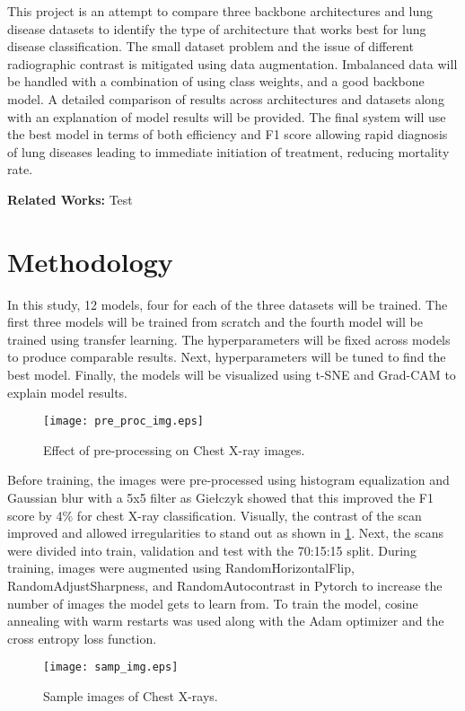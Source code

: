 \documentclass[10pt,twocolumn,letterpaper]{article}
\begin{document}
This project is an attempt to compare three backbone architectures and lung disease datasets to identify the type of architecture that works best for lung disease classification. The small dataset problem and the issue of different radiographic contrast \cite{andrew2022rad} is mitigated using data augmentation. Imbalanced data will be handled with a combination of using class weights, and a good backbone model. A detailed comparison of results across architectures and datasets along with an explanation of model results will be provided. The final system will use the best model in terms of both efficiency and F1 score allowing rapid diagnosis of lung diseases leading to immediate initiation of treatment, reducing mortality rate.

\textbf{Related Works:} Test 
\section{Methodology}
\label{sec:prop_method}
In this study, 12 models, four for each of the three datasets will be trained. The first three models will be trained from scratch and the fourth model will be trained using transfer learning. The hyperparameters will be fixed across models to produce comparable results. Next, hyperparameters will be tuned to find the best model. Finally, the models will be visualized using t-SNE and Grad-CAM \cite{jacobgilpytorchcam} to explain model results. 
\begin{figure}[t]
  \centering
  \texttt{[image: pre\_proc\_img.eps]}  
   \caption{Effect of pre-processing on Chest X-ray images.}
   \vspace{-1em}
   \label{fig:pre_proc_img}
\end{figure}
Before training, the images were pre-processed using histogram equalization and Gaussian blur with a 5x5 filter as Giełczyk \etal \cite{gielczyk2022pre} showed that this improved the F1 score by 4\% for chest X-ray classification. Visually, the contrast of the scan improved and allowed irregularities to stand out as shown in \cref{fig:pre_proc_img}. Next, the scans were divided into train, validation and test with the 70:15:15 split. During training, images were augmented using RandomHorizontalFlip, RandomAdjustSharpness, and RandomAutocontrast in Pytorch \cite{transforms} to increase the number of images the model gets to learn from. To train the model, cosine annealing with warm restarts \cite{loshchilov2016sgdr} was used along with the Adam optimizer \cite{kingma2014adam} and the cross entropy loss function. 
\begin{figure}[t]
  \centering
  \texttt{[image: samp\_img.eps]}  
   \caption{Sample images of Chest X-rays.}
   \vspace{-0.5em}
   \label{fig:sample_img}
\end{figure}
\end{document}
